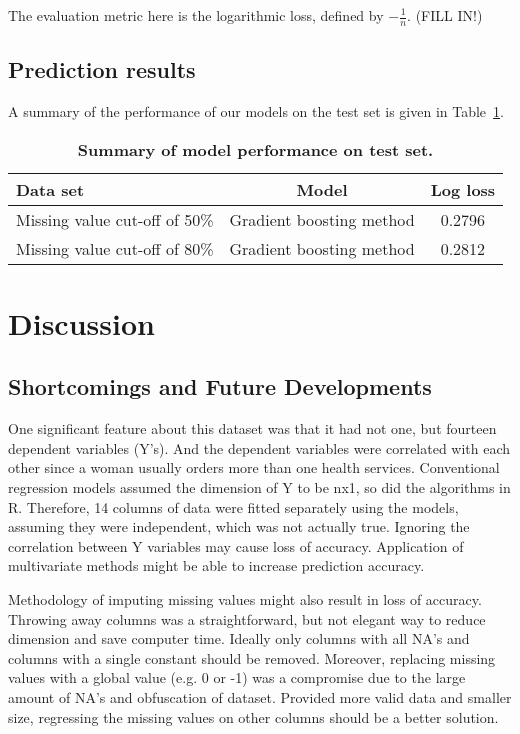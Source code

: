 \documentclass{article}\usepackage[]{graphicx}\usepackage[]{color}
\begin{document}
The evaluation metric here is the logarithmic loss, defined by $-\frac{1}{n}$. (FILL IN!)

\subsection{Prediction results}
A summary of the performance of our models on the test set is given in Table~\ref{tab-results}.

\begin{table}[ht]
  \centering
  \begin{tabular}{@{}|l|c|c|@{}}
    \hline
  	Data set & Model & Log loss\\ 
		\hline
  	Missing value cut-off of 50\% & Gradient boosting method & 0.2796 \\ 
    Missing value cut-off of 80\% & Gradient boosting method & 0.2812 \\
  	\hline
	\end{tabular}
	\caption{\textbf{Summary of model performance on test set.}}
  \label{tab-results}
\end{table}
\section{Discussion} 
\label{sec:discussion}

\subsection{Shortcomings and Future Developments}
One significant feature about this dataset was that it had not one, but fourteen dependent variables (Y's). And the dependent variables were correlated with each other since a woman usually orders more than one health services. Conventional regression models assumed the dimension of Y to be nx1, so did the algorithms in R. Therefore, 14 columns of data were fitted separately using the models, assuming they were independent, which was not actually true. Ignoring the correlation between Y variables may cause loss of accuracy. Application of multivariate methods might be able to increase prediction accuracy.

Methodology of imputing missing values might also result in loss of accuracy. Throwing away columns was a straightforward, but not elegant way to reduce dimension and save computer time. Ideally only columns with all NA's and columns with a single constant should be removed. Moreover, replacing missing values with a global value (e.g. 0 or -1) was a compromise due to the large amount of NA's and obfuscation of dataset. Provided more valid data and smaller size, regressing the missing values on other columns should be a better solution.
\end{document}
